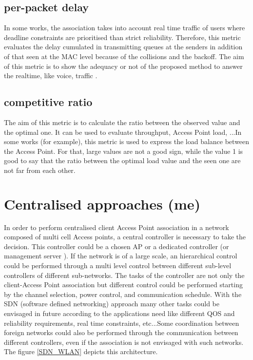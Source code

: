 \documentclass[journal,transmag]{IEEEtran}
\begin{document}
\subsection{per-packet delay} In some works, the association takes into account real time traffic of users where deadline constraints are prioritised than strict reliability. Therefore, this metric evaluates the delay cumulated in transmitting queues at the senders in addition of that seen at the MAC level because of the collisions and the backoff. The aim of this metric is to show the adequacy or not of the proposed method to answer the realtime, like voice, traffic \cite{06client_channel_WLAN}. 


\subsection{competitive ratio} 
The aim of this metric is to calculate the ratio between the observed value and the optimal one. It can be used to evaluate throughput, Access Point load, ...In some works (for example\cite{13smartAssoc}), this metric is used to express the load balance between the Access Point. For that, large values are not a good sign, while the value 1 is good to say that the ratio between the optimal load value and the seen one are not far from each other. 

\section{Centralised approaches (me)}
\label{centralised_works}
In order to perform centralised client Access Point association in a network composed of multi cell Access points, a central controller is necessary to take the decision. This controller could be a chosen AP or a dedicated controller (or management server \cite{08proportional_fairness_multiRate_LAN}). If the network is of a large scale, an hierarchical control could be performed through a multi level control between different sub-level controllers of different sub-networks. The tasks of the controller are not only the client-Access Point association but different control could be performed starting by the channel selection, power control, and communication schedule. With the SDN (software defined networking) approach many other tasks could be envisaged in future according to the applications need like different QOS and reliability requirements, real time constraints, etc...Some coordination between foreign networks could also be performed through the communication between different controllers, even if the association is not envisaged with such networks. The figure \ref{SDN_WLAN} depicts this architecture.\\
 
\end{document}
